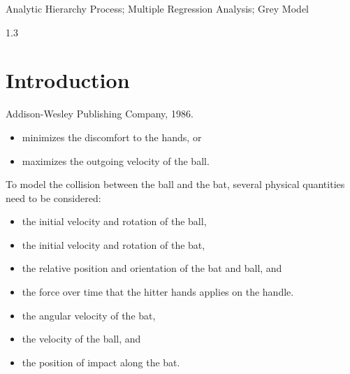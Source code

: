 \documentclass{mcmthesis}
\begin{document}
\vspace{12pt}  %

\begin{keywords}
Analytic Hierarchy Process; Multiple Regression Analysis; Grey Model
\end{keywords}

\maketitle

\newpage
{} 
\renewcommand{\contentsname}{\hfill Contents \hfill}
\setcounter{tocdepth}{3} 
\begin{spacing}{1.3}
    \tableofcontents
\end{spacing}
\setcounter{page}{2} 
\newpage

\section{Introduction}
Addison-Wesley Publishing Company, 1986.

\begin{itemize}
\item minimizes the discomfort to the hands, or
\item maximizes the outgoing velocity of the ball.
\end{itemize}

To model the collision between the ball and the bat, several physical quantities need to be considered:

\begin{itemize}
\item the initial velocity and rotation of the ball,
\item the initial velocity and rotation of the bat,
\item the relative position and orientation of the bat and ball, and
\item the force over time that the hitter hands applies on the handle.
\end{itemize}

\begin{itemize}
\item the angular velocity of the bat,
\item the velocity of the ball, and
\item the position of impact along the bat.
\end{itemize}
\end{document}
